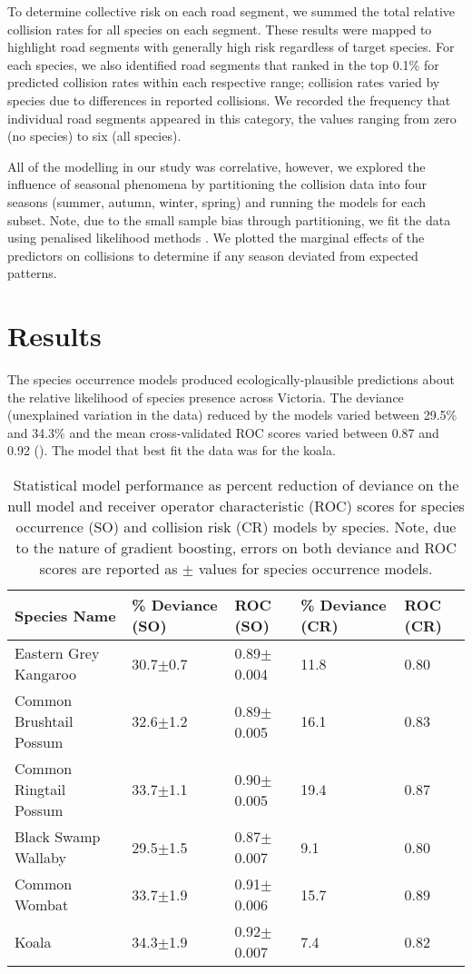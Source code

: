 To determine collective risk on each road segment, we summed the total relative collision rates for all species on each segment.  These results were mapped to highlight road segments with generally high risk regardless of target species. For each species, we also identified road segments that ranked in the top 0.1\% for predicted collision rates within each respective range; collision rates varied by species due to differences in reported collisions. We recorded the frequency that individual road segments appeared in this category, the values ranging from zero (no species) to six (all species).

All of the modelling in our study was correlative, however, we explored the influence of seasonal phenomena by partitioning the collision data into four seasons (summer, autumn, winter, spring) and running the models for each subset. Note, due to the small sample bias through partitioning, we fit the data using penalised likelihood methods \citep{firt93}.  We plotted the marginal effects of the predictors on collisions to determine if any season deviated from expected patterns.

\section{Results}

The species occurrence models produced ecologically-plausible predictions about the relative likelihood of species presence across Victoria. The deviance (unexplained variation in the data) reduced by the models varied between 29.5\% and 34.3\% and the mean cross-validated ROC scores varied between 0.87 and 0.92 (). The model that best fit the data was for the koala. 

\begin{table}[htp]
\caption[Statistical model performance for six mammal species]{Statistical model performance as percent reduction of deviance on the null model and receiver operator characteristic (ROC) scores for species occurrence (SO) and collision risk (CR) models by species. Note, due to the nature of gradient boosting, errors on both deviance and ROC scores are reported as $\pm$ values for species occurrence models.}
\centering
\begin{tabularx}{0.9\textwidth}{lllll} \toprule
Species Name			&\% Deviance (SO)	&ROC (SO)			&\% Deviance (CR)	&ROC (CR)\\
\midrule 
Eastern Grey Kangaroo	& 30.7$\pm$0.7 		& 0.89$\pm$0.004	& 11.8 				& 0.80 \\ 
Common Brushtail Possum & 32.6$\pm$1.2 		& 0.89$\pm$0.005 	& 16.1 				& 0.83 \\ 
Common Ringtail Possum 	& 33.7$\pm$1.1 		& 0.90$\pm$0.005 	& 19.4 				& 0.87 \\ 
Black Swamp Wallaby 	& 29.5$\pm$1.5 		& 0.87$\pm$0.007 	& 9.1 				& 0.80 \\ 
Common Wombat 			& 33.7$\pm$1.9 		& 0.91$\pm$0.006 	& 15.7 				& 0.89 \\ 
Koala 					& 34.3$\pm$1.9 		& 0.92$\pm$0.007 	& 7.4 				& 0.82 \\ 
\bottomrule
\end{tabularx}
\label{6sp_models}
\end{table}

